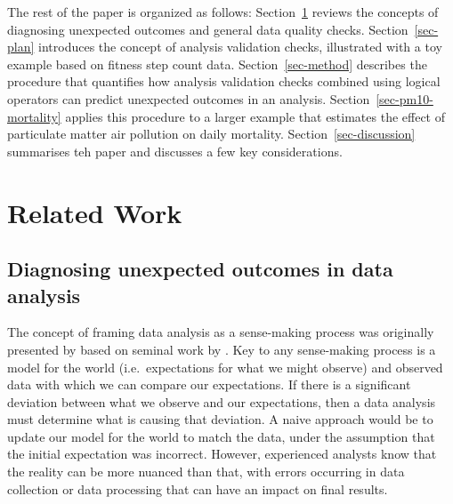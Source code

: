 \documentclass[
  12pt,
]{interact}
\begin{document}
The rest of the paper is organized as follows:
Section~\ref{sec-lit-review} reviews the concepts of diagnosing
unexpected outcomes and general data quality checks.
Section~\ref{sec-plan} introduces the concept of analysis validation
checks, illustrated with a toy example based on fitness step count data.
Section~\ref{sec-method} describes the procedure that quantifies how
analysis validation checks combined using logical operators can predict
unexpected outcomes in an analysis. Section~\ref{sec-pm10-mortality}
applies this procedure to a larger example that estimates the effect of
particulate matter air pollution on daily mortality.
Section~\ref{sec-discussion} summarises teh paper and discusses a few
key considerations.

\section{Related Work}\label{sec-lit-review}

\subsection{Diagnosing unexpected outcomes in data
analysis}\label{diagnosing-unexpected-outcomes-in-data-analysis}

The concept of framing data analysis as a sense-making process was
originally presented by \citet{grolemund_cognitive_2014} based on
seminal work by \citet{wild1999statistical}. Key to any sense-making
process is a model for the world (i.e.~expectations for what we might
observe) and observed data with which we can compare our expectations.
If there is a significant deviation between what we observe and our
expectations, then a data analysis must determine what is causing that
deviation. A naive approach would be to update our model for the world
to match the data, under the assumption that the initial expectation was
incorrect. However, experienced analysts know that the reality can be
more nuanced than that, with errors occurring in data collection or data
processing that can have an impact on final results.
\end{document}
